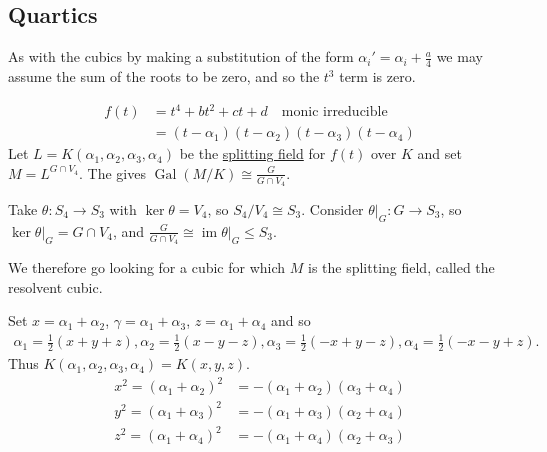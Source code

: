 \documentclass{article}
\DeclareMathOperator{\Gal}{Gal}
\begin{document}
\subsection{Quartics}
As with the cubics by making a substitution of the form $\alpha_i' = \alpha_i + \frac{a}{4}$ we may assume the sum of the roots to be zero, and so the $t^3$ term is zero.

\begin{align*}
    f(t) &= t^4 + b t^2 + ct + d \quad \text{monic irreducible} \\
         &= (t - \alpha_1)(t-\alpha_2)(t-\alpha_3)(t-\alpha_4)
\end{align*}
Let $L = K(\alpha_1, \alpha_2, \alpha_3, \alpha_4)$ be the \hyperlink{def:splitting}{splitting field} for $f(t)$ over $K$ and set $M = L^{G \cap V_4}$.
The  gives $\Gal(M/K) \cong \frac{G}{G \cap V_4}$.

\begin{center}
\end{center}

Take $\theta: S_4 \to S_3$ with $\ker \theta = V_4$, so $S_4 / V_4 \cong S_3$.
Consider $\theta|_G : G \to S_3$, so $\ker \theta|_G = G \cap V_4$, and $\frac{G}{G \cap V_4} \cong \operatorname{im} \theta|_G \leq S_3$.

We therefore go looking for a cubic for which $M$ is the splitting field, called the resolvent cubic.

Set $x= \alpha_1 + \alpha_2$, $\gamma = \alpha_1 + \alpha_3$, $z = \alpha_1 + \alpha_4$ and so
\begin{align*}
    \alpha_1 = \frac{1}{2}(x+y+z),
    \alpha_2=\frac{1}{2}(x - y - z),
    \alpha_3=\frac{1}{2}(-x+y-z),
    \alpha_4=\frac{1}{2}(-x-y+z).
\end{align*}
Thus $K(\alpha_1, \alpha_2, \alpha_3, \alpha_4)=K(x,y,z)$.
\begin{align*}
    x^2=(\alpha_1+\alpha_2)^2&=-(\alpha_1+\alpha_2)(\alpha_3+\alpha_4)\\
    y^2=(\alpha_1+\alpha_3)^2&=-(\alpha_1+\alpha_3)(\alpha_2+\alpha_4)\\
    z^2=(\alpha_1+\alpha_4)^2&=-(\alpha_1+\alpha_4)(\alpha_2+\alpha_3)
\end{align*}
\end{document}
